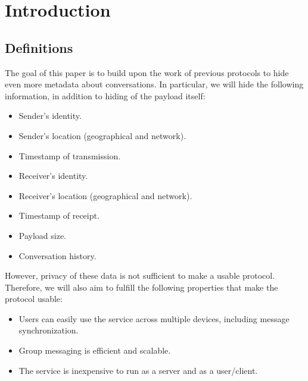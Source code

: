 \chapter{Introduction}

\label{Introduction}

\section{Definitions}\label{definitions}

The goal of this paper is to build upon the work of previous protocols to hide even more metadata about conversations. In particular, we will hide the following information, in addition to hiding of the payload itself:

\begin{itemize}
\item
  Sender's identity.
\item
  Sender's location (geographical and network).
\item
  Timestamp of transmission.
\item
  Receiver's identity.
\item
  Receiver's location (geographical and network).
\item
  Timestamp of receipt.
\item
  Payload size.
\item
  Conversation history.
\end{itemize}

However, privacy of these data is not sufficient to make a usable protocol. Therefore, we will also aim to fulfill the following properties that make the protocol usable:

\begin{itemize}
\item
  Users can easily use the service across multiple devices, including message synchronization.
\item
  Group messaging is efficient and scalable.
\item
  The service is inexpensive to run as a server and as a user/client.
\end{itemize}
